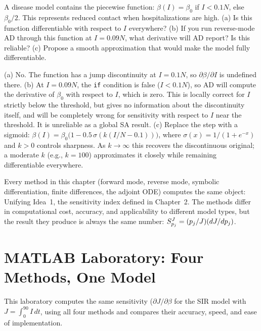 \begin{selfcheck}
A disease model contains the piecewise function:
$\beta(I) = \beta_0$ if $I < 0.1N$, else $\beta_0/2$.
This represents reduced contact when hospitalizations are high.
(a) Is this function differentiable with respect to $I$ everywhere?
(b) If you run reverse-mode AD through this function at $I = 0.09N$,
what derivative will AD report? Is this reliable?
(c) Propose a smooth approximation that would make the model
fully differentiable.
\end{selfcheck}
\begin{scAnswer}
(a) No. The function has a jump discontinuity at $I = 0.1N$,
so $\partial\beta/\partial I$ is undefined there.
(b) At $I = 0.09N$, the \texttt{if} condition is false ($I < 0.1N$),
so AD will compute the derivative of $\beta_0$ with respect to $I$,
which is zero. This is locally correct for $I$ strictly below the
threshold, but gives no information about the discontinuity itself,
and will be completely wrong for sensitivity with respect to $I$ near
the threshold. It is unreliable as a global SA result.
(c) Replace the step with a sigmoid:
$\beta(I) = \beta_0\bigl(1 - 0.5\,\sigma(k(I/N - 0.1))\bigr)$,
where $\sigma(x) = 1/(1+e^{-x})$ and $k > 0$ controls sharpness.
As $k \to \infty$ this recovers the discontinuous original;
a moderate $k$ (e.g., $k = 100$) approximates it closely while
remaining differentiable everywhere.
\end{scAnswer}

 Every method in this chapter (forward mode,
reverse mode, symbolic differentiation, finite differences, the adjoint
ODE) computes the same object: Unifying Idea~1, the sensitivity index
defined in Chapter~2. The methods differ in computational cost,
accuracy, and applicability to different model types, but the result they
produce is always the same number: $S_{p_j}^{J} = (p_j/J)(dJ/dp_j)$.

\section{MATLAB Laboratory: Four Methods, One Model}
\label{sec:ch7matlab}

This laboratory computes the same sensitivity ($\partial J/\partial\beta$
for the SIR model with $J = \int_0^{90} I\,dt$, using all four methods
and compares their accuracy, speed, and ease of implementation.

